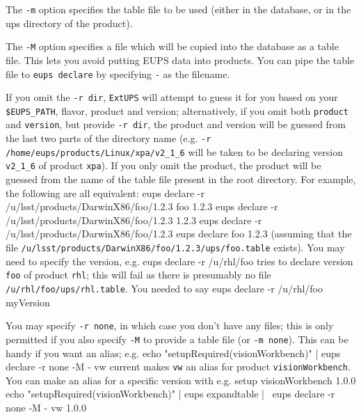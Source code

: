 \documentclass{article}
\newcommand{\code}[1]{\texttt{#1}}
\newcommand{\eups}{\code{ExtUPS}}
\let\overbatim=\verbatim
\let\oendverbatim=\endverbatim
\renewenvironment{verbatim}
{\center\minipage{16cm}\overbatim}
{\oendverbatim\endminipage\endcenter}
\begin{document}
The \code{-m} option specifies the table
file to be used (either in the database, or in the ups directory of the product).

The \code{-M} option specifies a file which will be copied into the
database as a table file. This lets you avoid putting EUPS data
into products. You can pipe the table file to \code{eups declare} by
specifying \code{-} as the filename.

If you omit the \code{-r dir}, \eups{} will attempt to guess it for you based
on your \code{\$EUPS\_PATH}, flavor, product and version; alternatively,
if you omit both \code{product} and \code{version}, but provide \code{-r dir},
the product and version will be guessed from the last two parts of the directory
name (e.g. \code{-r /home/eups/products/Linux/xpa/v2\_1\_6} will be taken to be
declaring version \code{v2\_1\_6} of product \code{xpa}).  If you only omit
the product, the product will be guessed from the name of the table file
present in the root directory. For example, the following are all equivalent:
\begin{verbatim}
  eups declare -r /u/lsst/products/DarwinX86/foo/1.2.3 foo 1.2.3
  eups declare -r /u/lsst/products/DarwinX86/foo/1.2.3 1.2.3
  eups declare -r /u/lsst/products/DarwinX86/foo/1.2.3
  eups declare foo 1.2.3
\end{verbatim}
(assuming that the file \code{/u/lsst/products/DarwinX86/foo/1.2.3/ups/foo.table}
exists). You may need to specify the version, e.g.
\begin{verbatim}
  eups declare -r /u/rhl/foo
\end{verbatim}
tries to declare version \code{foo} of product \code{rhl}; this will fail as
there is presumably no file \code{/u/rhl/foo/ups/rhl.table}.  You needed to say
\begin{verbatim}
  eups declare -r /u/rhl/foo myVersion
\end{verbatim}

You may specify \code{-r none}, in which case you don't have any files; this
is only permitted if you also specify \code{-M} to provide a table file (or \code{-m none}).
This can be handy if you want an alias; e.g.
\begin{verbatim}
echo "setupRequired(visionWorkbench)" | eups declare -r none -M - vw current
\end{verbatim}
makes \code{vw} an alias for product \code{visionWorkbench}. You can make
an alias for a specific version with e.g.
\begin{verbatim}
setup visionWorkbench 1.0.0
echo "setupRequired(visionWorkbench)" | eups expandtable | \
	eups declare -r none -M - vw 1.0.0
\end{verbatim}
\end{document}
